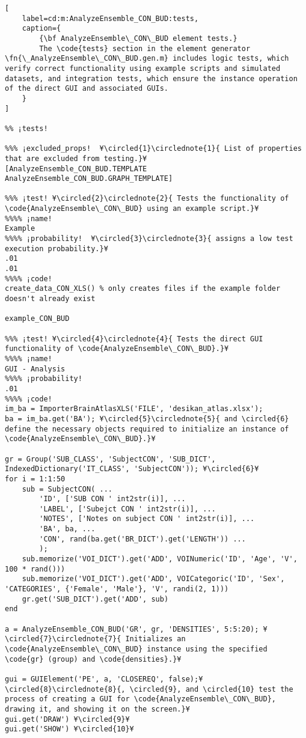 \documentclass{tufte-handout}
\begin{document}
\begin{lstlisting}[
	label=cd:m:AnalyzeEnsemble_CON_BUD:tests,
	caption={
		{\bf AnalyzeEnsemble\_CON\_BUD element tests.}
		The \code{tests} section in the element generator \fn{\_AnalyzeEnsemble\_CON\_BUD.gen.m} includes logic tests, which verify correct functionality using example scripts and simulated datasets, and integration tests, which ensure the instance operation of the direct GUI and associated GUIs.
	}
]	

%% ¡tests!

%%% ¡excluded_props!  ¥\circled{1}\circlednote{1}{ List of properties that are excluded from testing.}¥
[AnalyzeEnsemble_CON_BUD.TEMPLATE AnalyzeEnsemble_CON_BUD.GRAPH_TEMPLATE]

%%% ¡test! ¥\circled{2}\circlednote{2}{ Tests the functionality of \code{AnalyzeEnsemble\_CON\_BUD} using an example script.}¥
%%%% ¡name!
Example
%%%% ¡probability!  ¥\circled{3}\circlednote{3}{ assigns a low test execution probability.}¥
.01
.01
%%%% ¡code!
create_data_CON_XLS() % only creates files if the example folder doesn't already exist

example_CON_BUD

%%% ¡test! ¥\circled{4}\circlednote{4}{ Tests the direct GUI functionality of \code{AnalyzeEnsemble\_CON\_BUD}.}¥
%%%% ¡name!
GUI - Analysis
%%%% ¡probability!
.01
%%%% ¡code!
im_ba = ImporterBrainAtlasXLS('FILE', 'desikan_atlas.xlsx');
ba = im_ba.get('BA'); ¥\circled{5}\circlednote{5}{ and \circled{6} define the necessary objects required to initialize an instance of \code{AnalyzeEnsemble\_CON\_BUD}.}¥

gr = Group('SUB_CLASS', 'SubjectCON', 'SUB_DICT', IndexedDictionary('IT_CLASS', 'SubjectCON')); ¥\circled{6}¥
for i = 1:1:50 
    sub = SubjectCON( ...
        'ID', ['SUB CON ' int2str(i)], ...
        'LABEL', ['Subejct CON ' int2str(i)], ...
        'NOTES', ['Notes on subject CON ' int2str(i)], ...
        'BA', ba, ...
        'CON', rand(ba.get('BR_DICT').get('LENGTH')) ...
        );
    sub.memorize('VOI_DICT').get('ADD', VOINumeric('ID', 'Age', 'V', 100 * rand()))
    sub.memorize('VOI_DICT').get('ADD', VOICategoric('ID', 'Sex', 'CATEGORIES', {'Female', 'Male'}, 'V', randi(2, 1)))
    gr.get('SUB_DICT').get('ADD', sub)
end

a = AnalyzeEnsemble_CON_BUD('GR', gr, 'DENSITIES', 5:5:20); ¥\circled{7}\circlednote{7}{ Initializes an \code{AnalyzeEnsemble\_CON\_BUD} instance using the specified \code{gr} (group) and \code{densities}.}¥

gui = GUIElement('PE', a, 'CLOSEREQ', false);¥\circled{8}\circlednote{8}{, \circled{9}, and \circled{10} test the process of creating a GUI for \code{AnalyzeEnsemble\_CON\_BUD}, drawing it, and showing it on the screen.}¥
gui.get('DRAW') ¥\circled{9}¥
gui.get('SHOW') ¥\circled{10}¥


\end{lstlisting}
\end{document}
